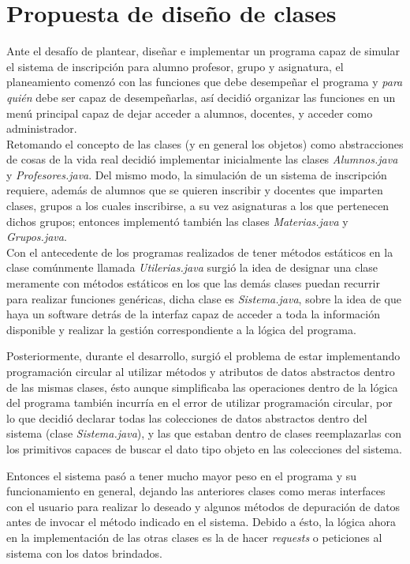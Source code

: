 \documentclass[a4paper,12pt]{article}
\begin{document}
\section{Propuesta de diseño de clases}

Ante el desafío de plantear, diseñar e implementar un programa capaz de simular el sistema de inscripción para alumno profesor, grupo y asignatura, el planeamiento comenzó con las funciones que debe desempeñar el programa y \textit{para quién} debe ser capaz de desempeñarlas, así decidió organizar las funciones en un menú principal capaz de dejar acceder a alumnos, docentes, y acceder como administrador.\\

Retomando el concepto de las clases (y en general los objetos) como abstracciones de cosas de la vida real decidió implementar inicialmente las clases \textit{Alumnos.java} y \textit{Profesores.java}. Del mismo modo, la simulación de un sistema de inscripción requiere, además de alumnos que se quieren inscribir y docentes que imparten clases, grupos a los cuales inscribirse, a su vez asignaturas a los que pertenecen dichos grupos; entonces implementó también las clases \textit{Materias.java} y \textit{Grupos.java}.\\

Con el antecedente de los programas realizados de tener métodos estáticos en la clase comúnmente llamada \textit{Utilerias.java} surgió la idea de designar una clase meramente con métodos estáticos en los que las demás clases puedan recurrir para realizar funciones genéricas, dicha clase es \textit{Sistema.java}, sobre la idea de que haya un software detrás de la interfaz capaz de acceder a toda la información disponible y realizar la gestión correspondiente a la lógica del programa.

Posteriormente, durante el desarrollo, surgió el problema de estar implementando programación circular al utilizar métodos y atributos de datos abstractos dentro de las mismas clases, ésto aunque simplificaba las operaciones dentro de la lógica del programa también incurría en el error de utilizar programación circular, por lo que decidió declarar todas las colecciones de datos abstractos dentro del sistema (clase \textit{Sistema.java}), y las que estaban dentro de clases reemplazarlas con los primitivos capaces de buscar el dato tipo objeto en las colecciones del sistema.

Entonces el sistema pasó a tener mucho mayor peso en el programa y su funcionamiento en general, dejando las anteriores clases como meras interfaces con el usuario para realizar lo deseado y algunos métodos de depuración de datos antes de invocar el método indicado en el sistema. Debido a ésto, la lógica ahora en la implementación de las otras clases es la de hacer \textit{requests} o peticiones al sistema con los datos brindados.\\
\end{document}
